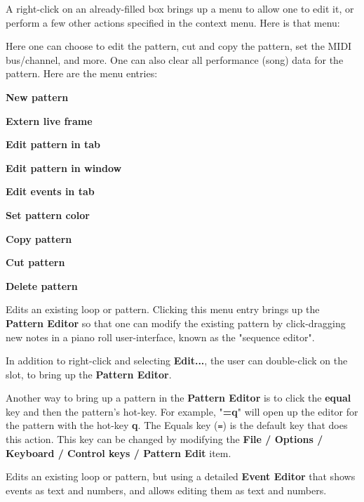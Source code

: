    A right-click on an already-filled box brings up a menu
   to allow one to edit it, or perform a few other actions
   specified in the context menu.  Here is that menu:

   Here one can choose to edit the pattern, cut and copy the pattern,
   set the MIDI bus/channel, and more.
   One can also clear all performance (song) data for the pattern.
   Here are the menu entries:
   
   \begin{enumber}
      \item \textbf{New pattern}
      \item \textbf{Extern live frame}
      \item \textbf{Edit pattern in tab}
      \item \textbf{Edit pattern in window}
      \item \textbf{Edit events in tab}
      \item \textbf{Set pattern color}
      \item \textbf{Copy pattern}
      \item \textbf{Cut pattern}
      \item \textbf{Delete pattern}
   \end{enumber}

   \setcounter{ItemCounter}{0}      %

   Edits an existing loop or pattern.
   Clicking this menu entry brings up the \textbf{Pattern Editor}
   so that one can modify the existing pattern by click-dragging new notes in a
   piano roll user-interface, known as the "sequence editor".

   In addition to right-click and selecting \textbf{Edit...}, the user can
   double-click on the slot, to bring up the \textbf{Pattern Editor}.

   Another way to bring up a pattern in the 
   \textbf{Pattern Editor} is to
   click the \textbf{equal} key and then the pattern's hot-key.
   For example, "\textbf{=q}" will open up the editor for the pattern with the
   hot-key \textbf{q}.
   The Equals key (\texttt{=}) is the default key that does this action.
   This key can be changed by modifying the
   \textbf{File / Options / Keyboard / Control keys / Pattern Edit} item.

   Edits an existing loop or pattern, but using a detailed \textbf{Event Editor}
   that shows events as text and numbers, and allows editing them as text and
   numbers.

